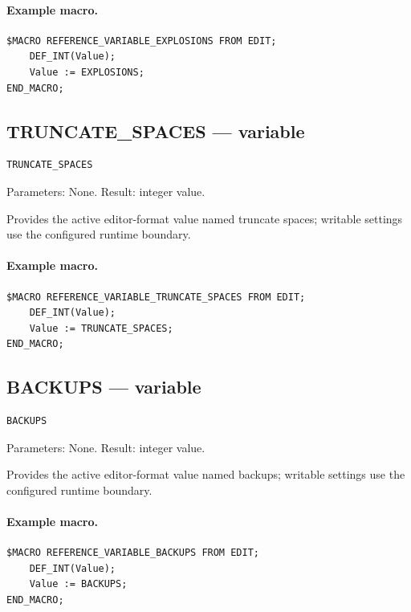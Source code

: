 \documentclass[a4paper,10pt,twoside,openany]{book}
\begin{document}
\paragraph{Example macro.}
\begin{verbatim}
$MACRO REFERENCE_VARIABLE_EXPLOSIONS FROM EDIT;
    DEF_INT(Value);
    Value := EXPLOSIONS;
END_MACRO;
\end{verbatim}

\label{prim:variable-truncate-spaces}
\subsection*{TRUNCATE\_SPACES --- variable}
\begin{verbatim}
TRUNCATE_SPACES
\end{verbatim}
Parameters: None. Result: integer value.

Provides the active editor-format value named truncate spaces; writable settings use the configured runtime boundary.

\paragraph{Example macro.}
\begin{verbatim}
$MACRO REFERENCE_VARIABLE_TRUNCATE_SPACES FROM EDIT;
    DEF_INT(Value);
    Value := TRUNCATE_SPACES;
END_MACRO;
\end{verbatim}

\label{prim:variable-backups}
\subsection*{BACKUPS --- variable}
\begin{verbatim}
BACKUPS
\end{verbatim}
Parameters: None. Result: integer value.

Provides the active editor-format value named backups; writable settings use the configured runtime boundary.

\paragraph{Example macro.}
\begin{verbatim}
$MACRO REFERENCE_VARIABLE_BACKUPS FROM EDIT;
    DEF_INT(Value);
    Value := BACKUPS;
END_MACRO;
\end{verbatim}
\end{document}
